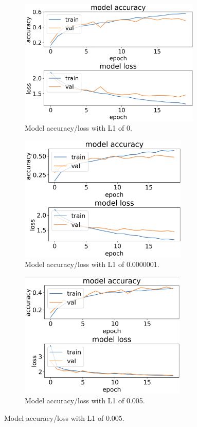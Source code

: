 \documentclass{article}
\begin{document}
\begin{figure} [H]
\centering
\begin{subfigure}{.49\linewidth}
  \centering
  \includegraphics[width=\linewidth, height=6cm]{l0.png}
  \caption{Model accuracy/loss with L1 of 0.}
  \label{fig:sub1}
\end{subfigure}%
\begin{subfigure}{.49\textwidth}
  \centering
  \includegraphics[width=\linewidth, height=6cm]{lsmall.png}
  \caption{Model accuracy/loss with L1 of 0.0000001.}
  \label{fig:sub2}
\end{subfigure}
\label{fig:test}
\begin{subfigure}{.5\linewidth}
  \centering
  \includegraphics[width=\linewidth, height=6cm]{l5.png}
  \caption{Model accuracy/loss with L1 of 0.005.}
  \label{fig:sub3}

\end{subfigure}
\end{figure}
\end{document}
